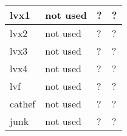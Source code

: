 \documentclass[a4paper,12pt]{article}
\begin{document}
\begin{adjustbox}{width=1\textwidth}
\begin{tabular}{|l|l|l|l|}
lvx1          & not used                                                       & ?             & ?                                                                                                                                                                                                                                                                                    \\ \hline
lvx2          & not used                                                       & ?             & ?                                                                                                                                                                                                                                                                                    \\ \hline
lvx3          & not used                                                       & ?             & ?                                                                                                                                                                                                                                                                                    \\ \hline
lvx4          & not used                                                       & ?             & ?                                                                                                                                                                                                                                                                                    \\ \hline
lvf           & not used                                                       & ?             & ?                                                                                                                                                                                                                                                                                    \\ \hline
cathef        & not used                                                       & ?             & ?                                                                                                                                                                                                                                                                                    \\ \hline
junk          & not used                                                       & ?             & ?                                                                                                                                                                                                                                                                                    \\ \hline

\end{tabular}
\end{adjustbox}
\end{document}
